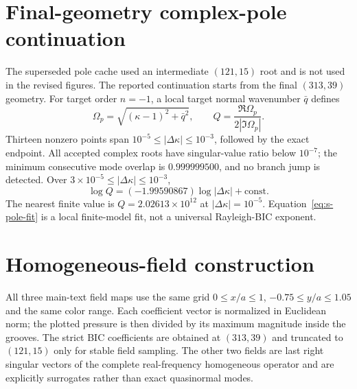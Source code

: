 \documentclass[aps,prl,reprint,superscriptaddress,nofootinbib,floatfix]{revtex4-2}
\begin{document}
\section{Final-geometry complex-pole continuation}

The superseded pole cache used an intermediate $(121,15)$ root and is not used
in the revised figures.  The reported continuation starts from the final
$(313,39)$ geometry.  For target order $n=-1$, a local target normal
wavenumber $\bar q$ defines
\begin{equation}
 \Omega_p=\sqrt{(\kappa-1)^2+\bar q^2},\qquad
 Q=\frac{\Re\Omega_p}{2|\Im\Omega_p|}.                                 \label{eq:s-pole}
\end{equation}
Thirteen nonzero points span
$10^{-5}\leq|\Delta\kappa|\leq10^{-3}$, followed by the exact endpoint.
All accepted complex roots have singular-value ratio below $10^{-7}$; the
minimum consecutive mode overlap is $0.999999500$, and no branch jump is
detected.  Over $3\times10^{-5}\leq|\Delta\kappa|\leq10^{-3}$,
\begin{equation}
 \log Q=(-1.99590867)\log|\Delta\kappa|+\mathrm{const}.                 \label{eq:s-pole-fit}
\end{equation}
The nearest finite value is $Q=2.02613\times10^{12}$ at
$|\Delta\kappa|=10^{-5}$.  Equation~\eqref{eq:s-pole-fit} is a local
finite-model fit, not a universal Rayleigh-BIC exponent.

\section{Homogeneous-field construction}

All three main-text field maps use the same grid
$0\leq x/a\leq1$, $-0.75\leq y/a\leq1.05$ and the same color range.  Each
coefficient vector is normalized in Euclidean norm; the plotted pressure is
then divided by its maximum magnitude inside the grooves.  The strict BIC
coefficients are obtained at $(313,39)$ and truncated to $(121,15)$ only for
stable field sampling.  The other two fields are last right singular vectors
of the complete real-frequency homogeneous operator and are explicitly
surrogates rather than exact quasinormal modes.
\end{document}
